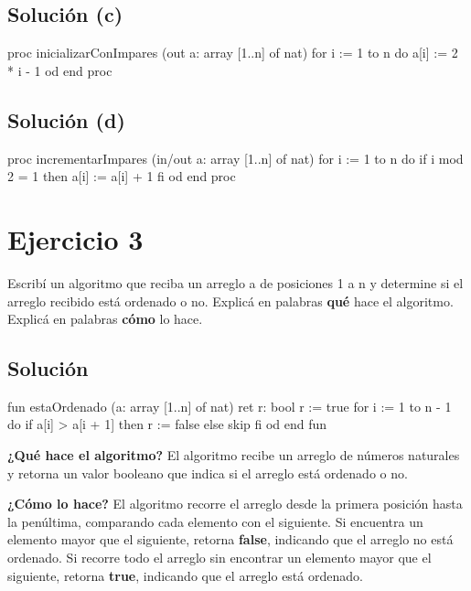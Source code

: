 \documentclass{article}
\begin{document}
\subsection{Solución (c)}
\begin{codebox}
\begin{pascallike}
proc inicializarConImpares (out a: array [1..n] of nat)
    for i := 1 to n do
    a[i] := 2 * i - 1
    od
end proc
\end{pascallike}
\end{codebox}

\subsection{Solución (d)}
\begin{codebox}
\begin{pascallike}
proc incrementarImpares (in/out a: array [1..n] of nat)
    for i := 1 to n do
    if i mod 2 = 1 then
        a[i] := a[i] + 1
    fi
    od
end proc
\end{pascallike}
\end{codebox}

\section{Ejercicio 3}
Escribí un algoritmo que reciba un arreglo a de posiciones 1 a n y determine si el arreglo recibido está ordenado o no. Explicá en palabras \textbf{qué} hace el algoritmo. Explicá en palabras \textbf{cómo} lo hace.

\subsection{Solución}
\begin{codebox}
\begin{pascallike}
fun estaOrdenado (a: array [1..n] of nat) ret r: bool
    r := true
    for i := 1 to n - 1 do
    if a[i] > a[i + 1] then
        r := false
    else
        skip
    fi
    od
end fun
\end{pascallike}
\end{codebox}

\textbf{¿Qué hace el algoritmo?} El algoritmo recibe un arreglo de números naturales y retorna un valor booleano que indica si el arreglo está ordenado o no.

\textbf{¿Cómo lo hace?} El algoritmo recorre el arreglo desde la primera posición hasta la penúltima, comparando cada elemento con el siguiente. Si encuentra un elemento mayor que el siguiente, retorna \textbf{false}, indicando que el arreglo no está ordenado. Si recorre todo el arreglo sin encontrar un elemento mayor que el siguiente, retorna \textbf{true}, indicando que el arreglo está ordenado.
\end{document}
